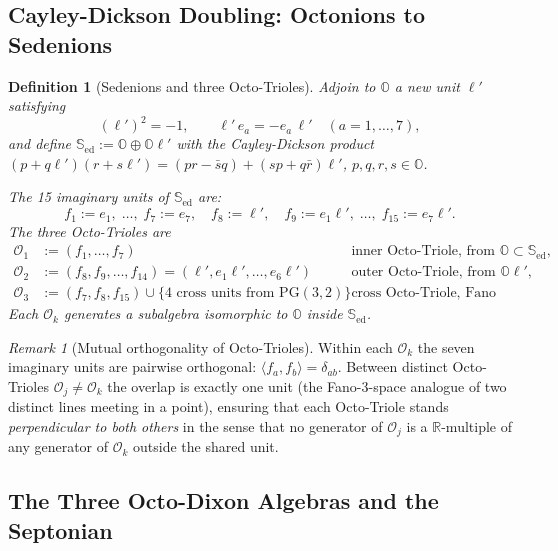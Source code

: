 \documentclass[12pt,a4paper]{article}
\newtheorem{definition}[theorem]{Definition}
\theoremstyle{remark}
\newtheorem*{remark}{Remark}
\begin{document}
\subsection*{Cayley-Dickson Doubling: Octonions to Sedenions}

\begin{definition}[Sedenions and three Octo-Trioles]
\label{def:sedenions}
Adjoin to $\mathbb{O}$ a new unit $\ell'$ satisfying
\[
  (\ell')^2 = -1,\qquad
  \ell'\, e_a = -e_a\,\ell'\quad (a=1,\ldots,7),
\]
and define
$\mathbb{S}_{\mathrm{ed}} := \mathbb{O}\oplus\mathbb{O}\ell'$
with the Cayley-Dickson product
$(p+q\ell')(r+s\ell') = (pr-\bar{s}q)+(sp+q\bar{r})\ell'$,
$p,q,r,s\in\mathbb{O}$.

The 15 imaginary units of $\mathbb{S}_{\mathrm{ed}}$ are:
\[
  f_1:=e_1,\;\ldots,\;f_7:=e_7,\quad
  f_8:=\ell',\quad
  f_9:=e_1\ell',\;\ldots,\;f_{15}:=e_7\ell'.
\]
The three \emph{Octo-Trioles} are
\begin{align*}
\mathcal{O}_1 &:= (f_1,\ldots,f_7)
  &&\text{inner Octo-Triole, from }\mathbb{O}\subset\mathbb{S}_{\mathrm{ed}},\\
\mathcal{O}_2 &:= (f_8,f_9,\ldots,f_{14})
  = (\ell',e_1\ell',\ldots,e_6\ell')
  &&\text{outer Octo-Triole, from }\mathbb{O}\ell',\\
\mathcal{O}_3 &:= (f_7,f_8,f_{15})
  \cup \{\text{4 cross units from }\mathrm{PG}(3,2)\}
  &&\text{cross Octo-Triole, Fano 3-space data.}
\end{align*}
Each $\mathcal{O}_k$ generates a subalgebra isomorphic to $\mathbb{O}$
inside $\mathbb{S}_{\mathrm{ed}}$.
\end{definition}

\begin{remark}[Mutual orthogonality of Octo-Trioles]
Within each $\mathcal{O}_k$ the seven imaginary units are pairwise
orthogonal: $\langle f_a,f_b\rangle = \delta_{ab}$.
Between distinct Octo-Trioles $\mathcal{O}_j\neq\mathcal{O}_k$ the
overlap is exactly one unit (the Fano-3-space analogue of two distinct
lines meeting in a point), ensuring that each Octo-Triole stands
\emph{perpendicular to both others} in the sense that no generator of
$\mathcal{O}_j$ is a $\mathbb{R}$-multiple of any generator of
$\mathcal{O}_k$ outside the shared unit.
\end{remark}

\subsection*{The Three Octo-Dixon Algebras and the Septonian}
\end{document}
